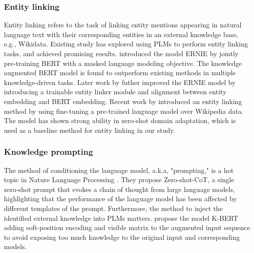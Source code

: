 \subsubsection{Entity linking}
Entity linking \cite{li_deep_2020} refers to the task of linking entity mentions appearing in natural language text with their corresponding entities in an external knowledge base, e.g., Wikidata. 
Existing study has explored using PLMs to perform entity linking tasks, and achieved promising results. 
\citet{zhang_ernie_2019} introduced the model ERNIE by jointly pre-training BERT with a masked language modeling objective. The knowledge augmented BERT model is found to outperform existing methods in multiple knowledge-driven tasks. 
Later work by \citet{peters_knowledge_2019} futher improved the ERNIE model by introducing a trainable entity linker module and alignment between entity embedding and BERT embedding. 
Recent work by \citet{ayoola_refined_2022} introduced an entity linking method by using fine-tuning a pre-trained language model over Wikipedia data. The model has shown strong ability in zero-shot domain adaptation, which is used as a baseline method for entity linking in our study. 

\subsubsection{Knowledge prompting} %
The method of conditioning the language model, a.k.a, "prompting," is a hot topic in Nature Language Processing \cite{kojima_large_2022}. They \cite{kojima_large_2022} propose Zero-shot-CoT, a single zero-shot prompt that evokes a chain of thought from large language models, highlighting that the performance of the language model has been affected by different templates of the prompt.
Furthermore, the method to inject the identified external knowledge into PLMs matters. \citet{liu_k-bert_2020} propose the model K-BERT adding soft-position encoding and visible matrix to the augmented input sequence to avoid exposing too much knowledge to the original input and corresponding models. 

